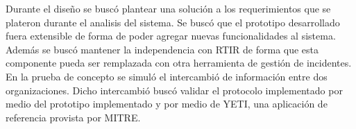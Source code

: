 Durante el diseño se buscó plantear una solución a los requerimientos que se plateron durante el analisis del sistema. Se buscó que el prototipo desarrollado fuera extensible de forma de poder agregar nuevas funcionalidades al sistema. Además se buscó mantener la independencia con RTIR de forma que esta componente pueda ser remplazada con otra herramienta de gestión de incidentes. \\

En la prueba de concepto se simuló el intercambió de información entre dos organizaciones. Dicho intercambió buscó validar el protocolo implementado por medio del prototipo implementado y por medio de YETI, una aplicación de referencia provista por MITRE.


